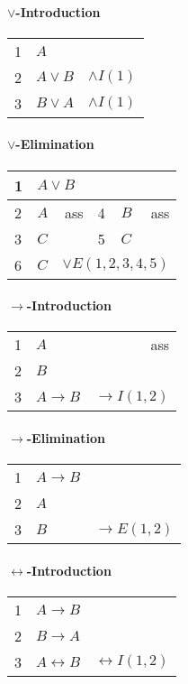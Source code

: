 \documentclass[10pt,twoside,twocolumn]{article}
\providecommand{\tabularnewline}{\\}
\begin{document}
\paragraph{$\boldsymbol{\lor}$-Introduction}

\begin{tabular}{llr}
1 & $A$ & \tabularnewline
2 & $A\lor B$ & $\land I\left(1\right)$\tabularnewline
3 & $B\lor A$ & $\land I\left(1\right)$\tabularnewline
\end{tabular}


\paragraph{$\boldsymbol{\lor}$-Elimination}

\begin{tabular}{|llr|llr|}
\multicolumn{1}{l}{1} & \multicolumn{5}{l}{$A\lor B$}\tabularnewline
\hline 
2 & $A$ & ass & 4 & $B$ & ass\tabularnewline
3 & $C$ &  & 5 & $C$ & \tabularnewline
\hline 
\multicolumn{1}{l}{6} & $C$ & \multicolumn{4}{r}{$\lor E\left(1,2,3,4,5\right)$}\tabularnewline
\end{tabular}


\paragraph{$\boldsymbol{\rightarrow}$-Introduction}

\begin{tabular}{|llr|}
\hline 
1 & $A$ & ass\tabularnewline
2 & $B$ & \tabularnewline
\hline 
\multicolumn{1}{l}{3} & $A\rightarrow B$ & \multicolumn{1}{r}{$\rightarrow I\left(1,2\right)$}\tabularnewline
\end{tabular}


\paragraph{$\boldsymbol{\rightarrow}$-Elimination}

\begin{tabular}{llr}
1 & $A\rightarrow B$ & \tabularnewline
2 & $A$ & \tabularnewline
3 & $B$ & $\rightarrow E\left(1,2\right)$\tabularnewline
\end{tabular}


\paragraph{$\boldsymbol{\leftrightarrow}$-Introduction}

\begin{tabular}{llr}
1 & $A\rightarrow B$ & \tabularnewline
2 & $B\rightarrow A$ & \tabularnewline
3 & $A\leftrightarrow B$ & $\leftrightarrow I\left(1,2\right)$\tabularnewline
\end{tabular}
\end{document}
